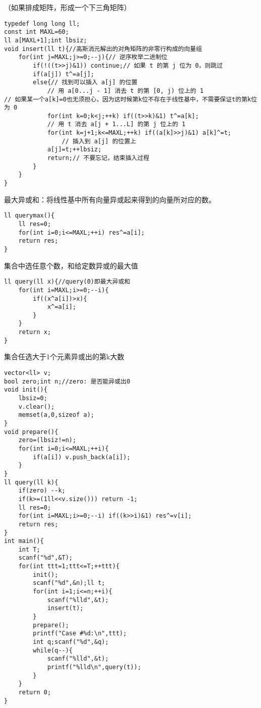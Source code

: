 \documentclass[UTF8]{ctexart}
\begin{document}
（如果排成矩阵，形成一个下三角矩阵）

\begin{lstlisting}
typedef long long ll;
const int MAXL=60;
ll a[MAXL+1];int lbsiz;
void insert(ll t){//高斯消元解出的对角矩阵的非零行构成的向量组 
    for(int j=MAXL;j>=0;--j){// 逆序枚举二进制位
        if(!((t>>j)&1)) continue;// 如果 t 的第 j 位为 0，则跳过
        if(a[j]) t^=a[j];
        else{// 找到可以插入 a[j] 的位置
            // 用 a[0...j - 1] 消去 t 的第 [0, j) 位上的 1
// 如果某一个a[k]=0也无须担心，因为这时候第k位不存在于线性基中，不需要保证t的第k位为 0	
            for(int k=0;k<j;++k) if((t>>k)&1) t^=a[k];
            // 用 t 消去 a[j + 1...L] 的第 j 位上的 1
            for(int k=j+1;k<=MAXL;++k) if((a[k]>>j)&1) a[k]^=t;
                // 插入到 a[j] 的位置上
            a[j]=t;++lbsiz;
            return;// 不要忘记，结束插入过程
        }
    }
}
\end{lstlisting}

最大异或和：将线性基中所有向量异或起来得到的向量所对应的数。

\begin{lstlisting}
ll querymax(){
    ll res=0;
    for(int i=0;i<=MAXL;++i) res^=a[i];
    return res;
}
\end{lstlisting}

集合中选任意个数，和给定数异或的最大值

\begin{lstlisting}
ll query(ll x){//query(0)即最大异或和
    for(int i=MAXL;i>=0;--i){
        if((x^a[i])>x){
            x^=a[i];
        }
    }
    return x;
}
\end{lstlisting}

集合任选大于1个元素异或出的第k大数

\begin{lstlisting}
vector<ll> v;
bool zero;int n;//zero: 是否能异或出0
void init(){
    lbsiz=0;
    v.clear();
    memset(a,0,sizeof a);
}
void prepare(){
    zero=(lbsiz!=n);
    for(int i=0;i<=MAXL;++i){
        if(a[i]) v.push_back(a[i]);
    }
}
ll query(ll k){
    if(zero) --k;
    if(k>=(1ll<<v.size())) return -1;
    ll res=0;
    for(int i=MAXL;i>=0;--i) if((k>>i)&1) res^=v[i];
    return res;
}
int main(){
    int T;
    scanf("%d",&T);
    for(int ttt=1;ttt<=T;++ttt){
        init();
        scanf("%d",&n);ll t;
        for(int i=1;i<=n;++i){
            scanf("%lld",&t);
            insert(t);
        }
        prepare();
        printf("Case #%d:\n",ttt);
        int q;scanf("%d",&q);
        while(q--){
            scanf("%lld",&t);
            printf("%lld\n",query(t));
        }
    }
    return 0;
}
\end{lstlisting}
\end{document}
